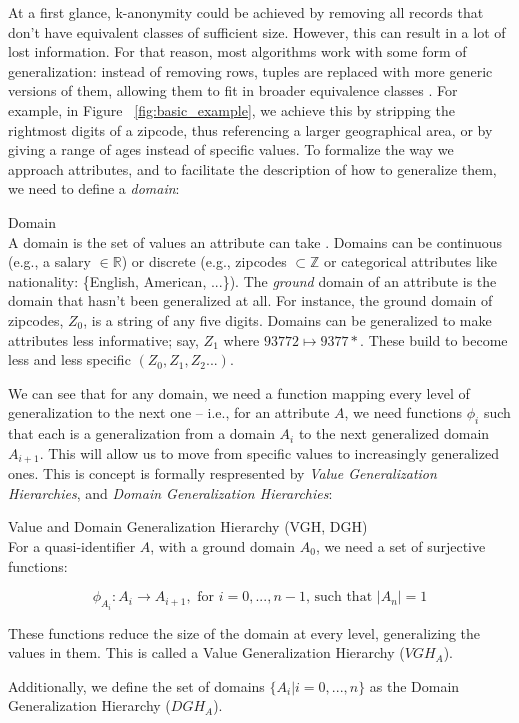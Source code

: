 At a first glance, k-anonymity could be achieved by removing all records that don't have equivalent classes of sufficient size. However, this can result in a lot of lost information. For that reason, most algorithms work with some form of generalization: instead of removing rows, tuples are replaced with more generic versions of them, allowing them to fit in broader equivalence classes \cite{kanon_algos}\cite{mondrian}. For example, in Figure ~\ref{fig:basic_example}, we achieve this by stripping the rightmost digits of a zipcode, thus referencing a larger geographical area, or by giving a range of ages instead of specific values. To formalize the way we approach attributes, and to facilitate the description of how to generalize them, we need to define a \textit{domain}:

\begin{definition}{Domain} \\
A domain is the set of values an attribute can take \cite{kanon_algos}. Domains can be continuous (e.g., a salary $\in \mathbb{R}$) or discrete (e.g., zipcodes $\subset \mathbb{Z}$ or categorical attributes like nationality: \{English, American, ...\}). The \textit{ground} domain of an attribute is the domain that hasn't been generalized at all. For instance, the ground domain of zipcodes, $Z_0$, is a string of any five digits. Domains can be generalized to make attributes less informative; say, $Z_1$ where $93772 \mapsto 9377*$. These build to become less and less specific $(Z_0, Z_1, Z_2...)$.
\end{definition}

We can see that for any domain, we need a function mapping every level of generalization to the next one -- i.e., for an attribute $A$, we need functions $\phi_i$ such that each is a generalization from a domain $A_i$ to the next generalized domain $A_{i+1}$. This will allow us to move from specific values to increasingly generalized ones. This is concept is formally respresented by \textit{Value Generalization Hierarchies}, and \textit{Domain Generalization Hierarchies}:

\begin{definition}{Value and Domain Generalization Hierarchy (VGH, DGH)}\\
For a quasi-identifier $A$, with a ground domain $A_0$, we need a set of surjective functions:

$$\phi_{A_i}: A_{i} \to A_{i+1}, \mbox{ for } i=0,...,n-1 \mbox{, such that } |A_n|=1$$ 

These functions reduce the size of the domain at every level, generalizing the values in them. This is called a Value Generalization Hierarchy ($VGH_A$).  

Additionally, we define the set of domains $\{A_i| i = 0,...,n\}$ as the Domain Generalization Hierarchy ($DGH_A$).
\end{definition}

